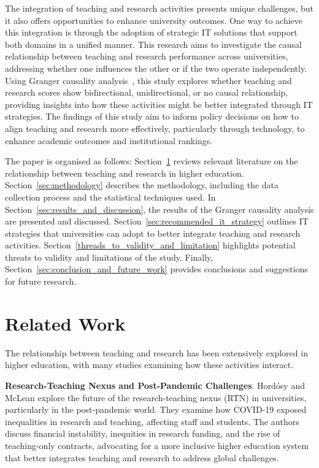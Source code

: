 \documentclass[a4paper, conference]{IEEEtran}
\begin{document}
The integration of teaching and research activities presents unique challenges, but it also offers opportunities to enhance university outcomes. One way to achieve this integration is through the adoption of strategic IT solutions that support both domains in a unified manner. This research aims to investigate the causal relationship between teaching and research performance across universities, addressing whether one influences the other or if the two operate independently. Using Granger causality analysis~\cite{granger1969investigating}, this study explores whether teaching and research scores show bidirectional, unidirectional, or no causal relationship, providing insights into how these activities might be better integrated through IT strategies. The findings of this study aim to inform policy decisions on how to align teaching and research more effectively, particularly through technology, to enhance academic outcomes and institutional rankings.

The paper is organised as follows: Section~\ref{sec:related_work} reviews relevant literature on the relationship between teaching and research in higher education. Section~\ref{sec:methodology} describes the methodology, including the data collection process and the statistical techniques used. In Section~\ref{sec:results_and_discussion}, the results of the Granger causality analysis are presented and discussed. Section~\ref{sec:recommended_it_strategy} outlines IT strategies that universities can adopt to better integrate teaching and research activities. Section~\ref{threads_to_validity_and_limitation} highlights potential threats to validity and limitations of the study. Finally, Section~\ref{sec:conclusion_and_future_work} provides conclusions and suggestions for future research.

\section{Related Work} \label{sec:related_work}  
The relationship between teaching and research has been extensively explored in higher education, with many studies examining how these activities interact. 

\textbf{Research-Teaching Nexus and Post-Pandemic Challenges}. Hordósy and McLean \cite{hordosy2022future} explore the future of the research-teaching nexus (RTN) in universities, particularly in the post-pandemic world. They examine how COVID-19 exposed inequalities in research and teaching, affecting staff and students. The authors discuss financial instability, inequities in research funding, and the rise of teaching-only contracts, advocating for a more inclusive higher education system that better integrates teaching and research to address global challenges.  
\end{document}
